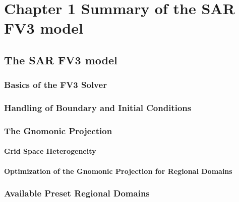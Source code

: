 \chapter{Chapter 1 Summary of the SAR FV3 model}
 
\section{The SAR FV3 model}
\subsection{Basics of the FV3 Solver}
\subsection{Handling of Boundary and Initial Conditions}
\subsection{The Gnomonic Projection}
\subsubsection{Grid Space Heterogeneity}
\subsubsection{Optimization of the Gnomonic Projection for Regional Domains}
\subsection{Available Preset Regional Domains}

